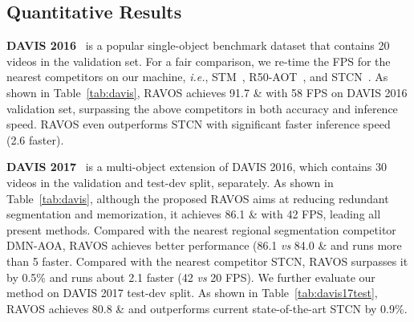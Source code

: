 \documentclass[journal]{IEEEtran}
\def\ie{\emph{i.e.}}
\def\vs{\emph{vs}}
\begin{document}
\subsection{Quantitative Results}
\label{Quantitative}

\textbf{DAVIS 2016}~\cite{DAVIS2016} is a popular single-object benchmark dataset that contains 20 videos in the validation set. For a fair comparison, we re-time the FPS for the nearest competitors on our machine, \ie, STM~\cite{STM}, R50-AOT~\cite{AOT}, and STCN~\cite{STCN}.
As shown in Table~\ref{tab:davis}, RAVOS achieves 91.7 \& with 58 FPS on DAVIS 2016 validation set, surpassing the above competitors in both accuracy and inference speed. RAVOS even outperforms STCN with significant faster inference speed (2.6 faster).




\textbf{DAVIS 2017}~\cite{DAVIS} is a multi-object extension of DAVIS 2016, which contains 30 videos in the validation and test-dev split, separately. As shown in Table~\ref{tab:davis}, although the proposed RAVOS aims at reducing redundant segmentation and memorization, it achieves 86.1 \& with 42 FPS, leading all present methods. Compared with the nearest regional segmentation competitor DMN-AOA, RAVOS achieves better performance (86.1 \vs{} 84.0 \& and runs more than 5 faster. Compared with the nearest competitor STCN, RAVOS surpasses it by 0.5\% and runs about 2.1 faster (42 \vs{} 20 FPS). We further evaluate our method on DAVIS 2017 test-dev split. As shown in Table~\ref{tab:davis17test}, RAVOS achieves 80.8 \& and outperforms current state-of-the-art STCN by 0.9\%.
\end{document}
